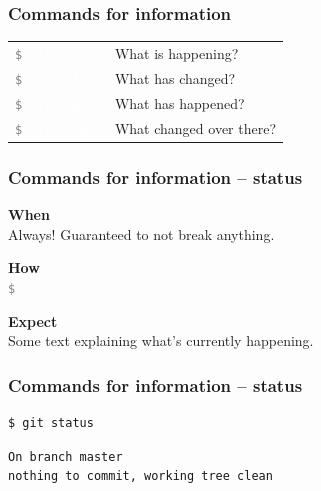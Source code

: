 \documentclass{beamer}
\newcommand{\keyword}[1]{\hspace{-1.0em}\textcolor{lkblue}{\textbf{#1}}\vspace{0.2em}} %
\newcommand{\command}[1]{\colorbox{black!78}{\vphantom{Ep}\texttt{\textcolor{gray}{\$}
\textcolor{white}{#1}}}}
\begin{document}
\begin{frame}[fragile]
  \frametitle{Commands for information}

  \begin{tabular}{ll}
    \command{git status} & What is happening? \\
    \command{git diff} & What has changed? \\
    \command{git log} & What has happened? \\
    \command{git show} & What changed over there? \\
  \end{tabular}

\end{frame}

\begin{frame}
  \frametitle{Commands for information -- status}

  \keyword{When}\\
  Always! Guaranteed to not break anything.
  \vspace{0.5em}

  \keyword{How}\\
  \command{git status}
  \vspace{0.5em}

  \keyword{Expect}\\
  Some text explaining what's currently happening.
\end{frame}

\begin{frame}[fragile]
  \frametitle{Commands for information -- status}

\begin{verbatim}
$ git status
\end{verbatim}
\pause{}
\begin{verbatim}
On branch master
nothing to commit, working tree clean
\end{verbatim}
\end{frame}
\end{document}
